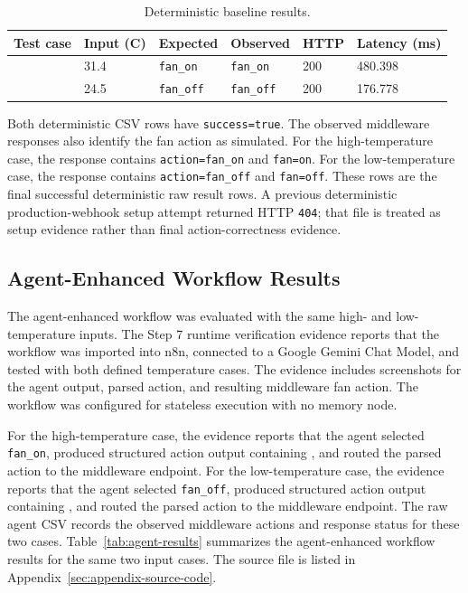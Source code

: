 \begin{table}[H]
  \centering
  \small
  \caption{Deterministic baseline results.}
  \label{tab:deterministic-results}
  \renewcommand{\arraystretch}{1.15}
  \begin{tabularx}{\textwidth}{@{}L{0.30\textwidth}L{0.10\textwidth}L{0.14\textwidth}L{0.14\textwidth}L{0.08\textwidth}Y@{}}
    \toprule
    Test case & Input (C) & Expected & Observed & HTTP & Latency (ms) \\
    \midrule
     & 31.4 & \texttt{fan\_on} & \texttt{fan\_on} & 200 & 480.398 \\
     & 24.5 & \texttt{fan\_off} & \texttt{fan\_off} & 200 & 176.778 \\
    \bottomrule
  \end{tabularx}
\end{table}

Both deterministic CSV rows have \texttt{success=true}. The observed middleware responses also identify the fan action as simulated. For the high-temperature case, the response contains \texttt{action=fan\_on} and \texttt{fan=on}. For the low-temperature case, the response contains \texttt{action=fan\_off} and \texttt{fan=off}. These rows are the final successful deterministic raw result rows. A previous deterministic production-webhook setup attempt returned HTTP \texttt{404}; that file is treated as setup evidence rather than final action-correctness evidence.

\subsection{Agent-Enhanced Workflow Results}\label{subsec:results-agent}

The agent-enhanced workflow was evaluated with the same high- and low-temperature inputs. The Step 7 runtime verification evidence reports that the workflow was imported into n8n, connected to a Google Gemini Chat Model, and tested with both defined temperature cases. The evidence includes screenshots for the agent output, parsed action, and resulting middleware fan action. The workflow was configured for stateless execution with no memory node.

For the high-temperature case, the evidence reports that the agent selected \texttt{fan\_on}, produced structured action output containing , and routed the parsed action to the  middleware endpoint. For the low-temperature case, the evidence reports that the agent selected \texttt{fan\_off}, produced structured action output containing , and routed the parsed action to the  middleware endpoint. The raw agent CSV records the observed middleware actions and response status for these two cases. Table~\ref{tab:agent-results} summarizes the  agent-enhanced workflow results for the same two input cases. The source file is listed in Appendix~\ref{sec:appendix-source-code}.

